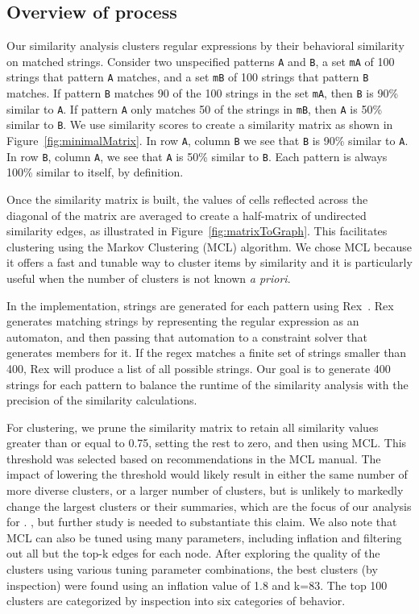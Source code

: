 \subsection{Overview of process}

Our similarity analysis clusters regular expressions by their behavioral similarity on matched strings.
Consider two unspecified patterns {\tt A} and {\tt B}, a set {\tt mA} of 100 strings that pattern {\tt A} matches, and a set {\tt mB} of 100 strings that pattern {\tt B} matches.
If pattern {\tt B} matches 90 of the 100 strings in the set {\tt mA}, then {\tt B} is 90\% similar to {\tt A}.
If pattern {\tt A} only matches 50 of the strings in {\tt mB}, then {\tt A} is 50\% similar to {\tt B}.
We use similarity scores to create a similarity matrix as shown in Figure~\ref{fig:minimalMatrix}.
In row {\tt A}, column {\tt B} we see that {\tt B} is 90\% similar to {\tt A}.
In row {\tt B}, column {\tt A}, we see that {\tt A} is 50\% similar to {\tt B}.  Each pattern is always 100\% similar to itself, by definition.

Once the similarity matrix is built, the values of cells reflected across the diagonal of the matrix are averaged to create a half-matrix of undirected similarity edges, as illustrated in Figure~\ref{fig:matrixToGraph}.
This facilitates clustering using the  Markov Clustering (MCL) algorithm.
We chose MCL  because it offers a fast and tunable way to cluster items by similarity and it is particularly useful when the number of clusters is not known \emph{a priori}.


In the implementation, strings are generated for each pattern using Rex~\cite{rex}.  Rex generates matching strings by representing the regular expression as an automaton, and then passing that automation to a constraint solver that generates members for it.  If the regex matches a finite set of strings smaller than 400, Rex will produce a list of all possible strings.
Our goal is to generate 400 strings for each pattern to balance the runtime of the similarity analysis with the precision of the similarity calculations.

For clustering, we prune the similarity matrix to retain all similarity values greater than or equal to 0.75, setting the rest to zero, and then using MCL.
This threshold was selected based on recommendations in the MCL manual. The impact of lowering the threshold would likely result  in either the same number of more diverse clusters, or a larger number of clusters, but is unlikely to markedly change the largest clusters or their summaries, which are the focus of our analysis for .
, but further study is needed to substantiate this claim.
We also note that MCL can also be tuned using many parameters, including inflation and filtering out all but the top-k edges for each node.
After exploring the quality of the clusters using various tuning parameter combinations, the best clusters (by inspection) were found using an inflation value of 1.8 and k=83.   The top 100 clusters are categorized by inspection into six categories of behavior.

